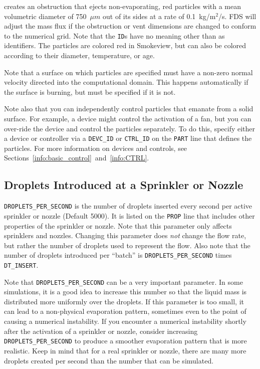 \documentclass[11pt]{book}
\newcommand{\ct}{\tt\small}
\begin{document}
\noindent
creates an obstruction that ejects non-evaporating, red particles with a mean volumetric diameter of 750~$\mu m$ out of its sides at a rate
of 0.1~kg/m$^2$/s. FDS will adjust the mass flux if the obstruction or vent dimensions are changed to conform to the numerical grid. Note that the
{\ct ID}s have no meaning other than as identifiers. The particles are colored red in Smokeview, but can also be colored according to their
diameter, temperature, or age.

Note that a surface on which particles are specified must have a non-zero normal velocity directed into the
computational domain. This happens automatically if the surface is burning, but must be specified
if it is not.

Note also that you can independently control particles that emanate from a solid surface. For example, a device might control the
activation of a fan, but you can over-ride the device and control the particles separately. To do this, specify either
a device or controller via a {\ct DEVC\_ID} or {\ct CTRL\_ID} on the {\ct PART} line that defines the particles. For more
information on devices and controls, see Sections~\ref{info:basic_control}~and~\ref{info:CTRL}.



\subsection{Droplets Introduced at a Sprinkler or Nozzle}

\label{info:sprinkler_droplets}

{\ct DROPLETS\_PER\_SECOND} is the  number of droplets inserted every
second per active sprinkler or nozzle (Default 5000). It is listed on the {\ct PROP} line that includes other properties of
the sprinkler or nozzle. Note that this parameter only affects sprinklers and nozzles.
Changing this parameter does {\em not} change the flow rate, but rather the number
of droplets used to represent the flow.
Also note that the number of droplets introduced per ``batch'' is {\ct DROPLETS\_PER\_SECOND} times {\ct DT\_INSERT}.

\begin{warning}
Note that {\ct DROPLETS\_PER\_SECOND} can be a very important parameter. In some simulations, it is a good idea to increase this number so that the
liquid mass is distributed more uniformly over the droplets. If this parameter is too small, it can lead to a non-physical evaporation pattern, sometimes even to the
point of causing a numerical instability. If you encounter a numerical instability shortly after the activation of a sprinkler or nozzle, consider increasing
{\ct DROPLETS\_PER\_SECOND} to produce a smoother evaporation pattern that is more realistic. Keep in mind that for a real sprinkler or nozzle, there are many more
droplets created per second than the number that can be simulated.
\end{warning}
\end{document}
